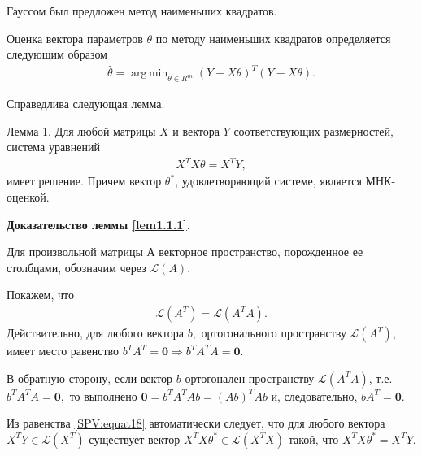 \documentclass[10pt,slidestop,usepdftitle=false]{beamer}
\DeclareMathOperator*{\argmin}{arg\,min}
\begin{document}
\begin{frame}

\pause
Гауссом был предложен метод наименьших квадратов.

\pause
\bigskip
Оценка вектора параметров $\theta$ по методу наименьших квадратов определяется
следующим образом
\begin{align*}
\widehat{\theta} = \argmin_{\theta \in R^{m}}\left(Y-X\theta\right)^T\left(Y-X\theta\right).
\end{align*}

\pause
\bigskip
Справедлива следующая лемма.

\begin{lemma}{Лемма 1.}
Для любой матрицы $X$ и вектора $Y$ соответствующих
размерностей, система уравнений
\begin{eqnarray}
X^TX\theta=X^TY, \label{SPV:equat17}
\end{eqnarray}
имеет решение. Причем вектор $\theta^*$, удовлетворяющий системе,
является МНК-оценкой. 
\label{lem1.1.1} 
\end{lemma}
\end{frame}
\begin{frame}
{\bf Доказательство леммы \ref{lem1.1.1}}.

Для произвольной матрицы А векторное пространство, порожденное ее
столбцами, обозначим через $\mathcal{L}(A).$
\bigskip
\pause

 Покажем, что
\begin{eqnarray}
\mathcal{L}(A^T)=\mathcal{L}(A^TA). \label{SPV:equat18}
\end{eqnarray}
Действительно, для любого вектора $b,$ ортогонального пространству
$\mathcal{L}(A^T)$, имеет место равенство $b^TA^T=\textbf{0}
\Rightarrow b^TA^TA=\textbf{0}$.
\bigskip
\pause

В обратную сторону, если вектор $b$ ортогонален пространству
$\mathcal{L}(A^TA)$, т.е. $b^TA^TA=\textbf{0},$ то выполнено
$\textbf{0}=b^TA^TAb=(Ab)^TAb$ и, следовательно, $bA^T=\textbf{0}$.
\pause
\bigskip

Из равенства \eqref{SPV:equat18} автоматически следует, что для
любого вектора $X^TY \in \mathcal{L}(X^T)$ существует вектор
$X^TX\theta^* \in \mathcal{L}(X^TX)$ такой, что $X^TX\theta^*=X^TY$.
\end{frame}
\end{document}
